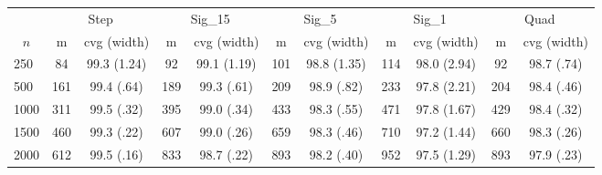 \documentclass{article}
\begin{document}
\begin{tabular}{lcccccccccc}
   \toprule
 
           & \multicolumn{2}{c}{Step}& \multicolumn{2}{c}{Sig\_15}& \multicolumn{2}{c}{Sig\_5}& \multicolumn{2}{c}{Sig\_1}& \multicolumn{2}{c}{Quad} \\ 
             \cmidrule(l{2pt}r{2pt}){2-3} \cmidrule(l{2pt}r{2pt}){4-5} \cmidrule(l{2pt}r{2pt}){6-7} \cmidrule(l{2pt}r{2pt}){8-9}  \cmidrule(l{2pt}r{2pt}){10-11} 
             \multicolumn{1}{c}{$n$} & \multicolumn{1}{c}{m}& \multicolumn{1}{c}{cvg (width)}& \multicolumn{1}{c}{m}& \multicolumn{1}{c}{cvg (width)}& \multicolumn{1}{c}{m}& \multicolumn{1}{c}{cvg (width)}& \multicolumn{1}{c}{m}& \multicolumn{1}{c}{cvg (width)}& \multicolumn{1}{c}{m}& \multicolumn{1}{c}{cvg (width)} \\ \midrule 
        250 & 84 & 99.3 (1.24) & 92 & 99.1 (1.19) & 101 & 98.8 (1.35) & 114 & 98.0 (2.94) & 92 & 98.7 (.74) \\ 
  500 & 161 & 99.4 (.64) & 189 & 99.3 (.61) & 209 & 98.9 (.82) & 233 & 97.8 (2.21) & 204 & 98.4 (.46) \\ 
  1000 & 311 & 99.5 (.32) & 395 & 99.0 (.34) & 433 & 98.3 (.55) & 471 & 97.8 (1.67) & 429 & 98.4 (.32) \\ 
  1500 & 460 & 99.3 (.22) & 607 & 99.0 (.26) & 659 & 98.3 (.46) & 710 & 97.2 (1.44) & 660 & 98.3 (.26) \\ 
  2000 & 612 & 99.5 (.16) & 833 & 98.7 (.22) & 893 & 98.2 (.40) & 952 & 97.5 (1.29) & 893 & 97.9 (.23) \\ 
   \hline
\end{tabular}
\end{document}

